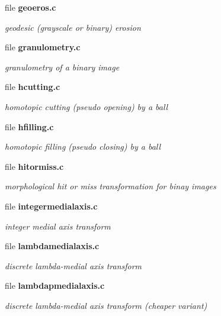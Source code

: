 \begin{CompactItemize}
\item 
file {\bf geoeros.c}
\begin{CompactList}\small\item\em geodesic (grayscale or binary) erosion \item\end{CompactList}

\item 
file {\bf granulometry.c}
\begin{CompactList}\small\item\em granulometry of a binary image \item\end{CompactList}

\item 
file {\bf hcutting.c}
\begin{CompactList}\small\item\em homotopic cutting (pseudo opening) by a ball \item\end{CompactList}

\item 
file {\bf hfilling.c}
\begin{CompactList}\small\item\em homotopic filling (pseudo closing) by a ball \item\end{CompactList}

\item 
file {\bf hitormiss.c}
\begin{CompactList}\small\item\em morphological hit or miss transformation for binay images \item\end{CompactList}

\item 
file {\bf integermedialaxis.c}
\begin{CompactList}\small\item\em integer medial axis transform \item\end{CompactList}

\item 
file {\bf lambdamedialaxis.c}
\begin{CompactList}\small\item\em discrete lambda-medial axis transform \item\end{CompactList}

\item 
file {\bf lambdapmedialaxis.c}
\begin{CompactList}\small\item\em discrete lambda-medial axis transform (cheaper variant) \item\end{CompactList}


\end{CompactItemize}
